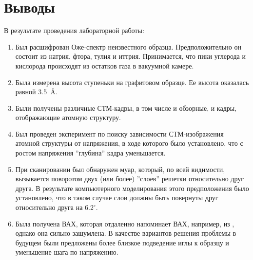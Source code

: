 \documentclass[a4paper, 12pt]{article}
\begin{document}
	\section{Выводы}
	
	В результате проведения лабораторной работы:
	
	\begin{enumerate}
		\item Был расшифрован Оже-спектр неизвестного образца. Предположительно он состоит из натрия, фтора, тулия и иттрия. Принимается, что пики углерода и кислорода происходят из остатков газа в вакуумной камере.
		
		\item Была измерена высота ступеньки на графитовом образце. Ее высота оказалась равной 3.5~\AA.
		
		\item Были получены различные СТМ-кадры, в том числе и обзорные, и кадры, отображающие атомную структуру.
		
		\item Был проведен эксперимент по поиску зависимости СТМ-изображения атомной структуры от напряжения, в ходе которого было установлено, что с ростом напряжения ''глубина'' кадра уменьшается.
		
		\item При сканировании был обнаружен муар, который, по всей видимости, вызывается поворотом двух (или более) ''слоев'' решетки относительно друг друга. В результате компьютерного моделирования этого предположения было установлено, что в таком случае слои должны быть повернуты друг относительно друга на $6.2^\circ$.
		
		\item Была получена ВАХ, которая отдаленно напоминает ВАХ, например, из \cite{Article}, однако она сильно зашумлена. В качестве вариантов решения проблемы в будущем были предложены более близкое подведение иглы к образцу и уменьшение шага по напряжению.
	\end{enumerate}
	
	\newpage
	
\end{document}

